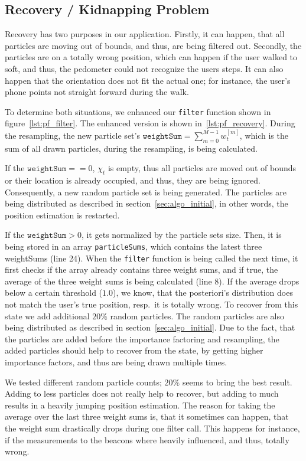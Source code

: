 \subsection{Recovery / Kidnapping Problem}\label{sec:algo_recovery}
Recovery has two purposes in our application. Firstly, it can happen, that all particles are moving out of bounds, and thus, are being filtered out. Secondly, the particles are on a totally wrong position, which can happen if the user walked to soft, and thus, the pedometer could not recognize the users steps. It can also happen that the orientation does not fit the actual one; for instance, the user's phone points not straight forward during the walk.

To determine both situations, we enhanced our \texttt{filter} function shown in figure~\ref{lst:pf_filter}. The enhanced version is shown in~\ref{lst:pf_recovery}. During the resampling, the new particle set's $\texttt{weightSum} = \sum_{m = 0}^{M-1} w^{[m]}_t$, which is the sum of all drawn particles, during the resampling, is being calculated.

If the $\texttt{weightSum} == 0$, $\chi_t$ is empty, thus all particles are moved out of bounds or their location is already occupied, and thus, they are being ignored. Consequently, a new random particle set is being generated. The particles are being distributed as described in section~\ref{sec:algo_initial}, in other words, the position estimation is restarted.

If the $\texttt{weightSum} > 0$, it gets normalized by the particle sets size. Then, it is being stored in an array \texttt{particleSums}, which contains the latest three weightSums (line 24). When the \texttt{filter} function is being called the next time, it first checks if the array already contains three weight sums, and if true, the average of the three weight sums is being calculated (line 8). If the average drops below a certain threshold ($1.0$), we know, that the posteriori's distribution does not match the user's true position, resp.\ it is totally wrong. To recover from this state we add additional $20\%$ random particles. The random particles are also being distributed as described in section~\ref{sec:algo_initial}. Due to the fact, that the particles are added before the importance factoring and resampling, the added particles should help to recover from the state, by getting higher importance factors, and thus are being drawn multiple times.

We tested different random particle counts; $20\%$ seems to bring the best result. Adding to less particles does not really help to recover, but adding to much results in a heavily jumping position estimation. The reason for taking the average over the last three weight sums is, that it sometimes can happen, that the weight sum drastically drops during one filter call. This happens for instance, if the measurements to the beacons where heavily influenced, and thus, totally wrong.

